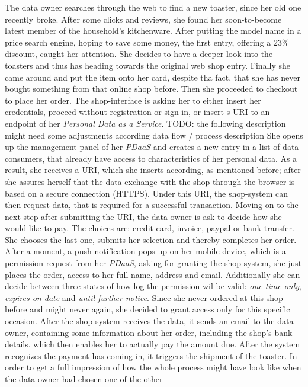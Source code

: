 \documentclass[12pt,english,a4paper,titlepage,cleardoublepage=empty,dottedtoc]{report}
\begin{document}
The data owner searches through the web to find a new toaster, since her
old one recently broke. After some clicks and reviews, she found her
soon-to-become latest member of the household's kitchenware. After
putting the model name in a price search engine, hoping to save some
money, the first entry, offering a 23\% discount, caught her attention.
She decides to have a deeper look into the toasters and thus has heading
towards the original web shop entry. Finally she came around and put the
item onto her card, despite tha fact, that she has never bought
something from that online shop before. Then she proceeded to checkout
to place her order. The shop-interface is asking her to either insert
her credentials, proceed without registration or sign-in, or insert s
URI to an endpoint of her \emph{Personal Data as a Service}. TODO: the
following description might need some adjustments according data flow /
process description She opens up the management panel of her
\emph{PDaaS} and creates a new entry in a list of data consumers, that
already have access to characteristics of her personal data. As a
result, she receives a URI, which she inserts according, as mentioned
before; after she assures herself that the data exchange with the shop
through the browser is based on a secure connection (HTTPS). Under this
URI, the shop-system can then request data, that is required for a
successful transaction. Moving on to the next step after submitting the
URI, the data owner is ask to decide how she would like to pay. The
choices are: credit card, invoice, paypal or bank transfer. She chooses
the last one, submits her selection and thereby completes her order.
After a moment, a push notification pops up on her mobile device, which
is a permission request from her \emph{PDaaS}, asking for granting the
shop-system, she just places the order, access to her full name, address
and email. Additionally she can decide between three states of how log
the permission wil be valid: \emph{one-time-only},
\emph{expires-on-date} and \emph{until-further-notice}. Since she never
ordered at this shop before and might never again, she decided to grant
access only for this specific occasion. After the shop-system receives
the data, it sends an email to the data owner, containing some
information about her order, including the shop's bank details. which
then enables her to actually pay the amount due. After the system
recognizes the payment has coming in, it triggers the shipment of the
toaster. In order to get a full impression of how the whole process
might have look like when the data owner had chosen one of the other
\end{document}
